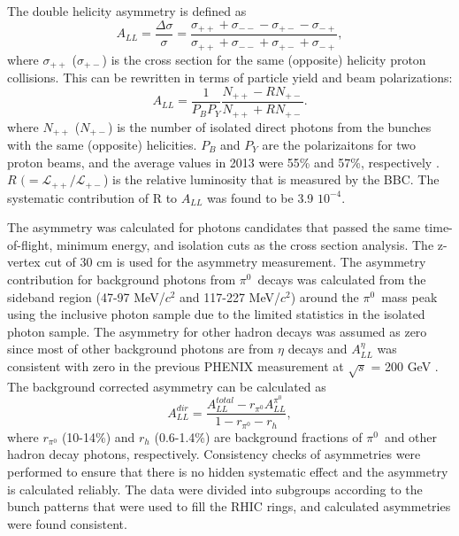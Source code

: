 \documentclass[twocolumn,letterpaper,aps,prl,longbibliography,superscriptaddress,floatfix]{revtex4-2}
\newcommand{\pizero}{\ensuremath{\pi^0}}
\begin{document}
The double helicity asymmetry is defined as
\begin{equation} \label{eq:all}
A_{LL} = \frac{\Delta\sigma}{\sigma} = \frac{\sigma_{++}+\sigma_{--}-\sigma_{+-}-\sigma_{-+}}{\sigma_{++}+\sigma_{--}+\sigma_{+-}+\sigma_{-+}},
\end{equation}
where $\sigma_{++}$ ($\sigma_{+-}$) is the cross section for the same (opposite) helicity proton collisions. This can be rewritten in terms of particle yield and beam polarizations:
\begin{equation}
A_{LL} = \frac{1}{P_BP_Y} \frac{N_{++}-RN_{+-}}{N_{++}+RN_{+-}}.
\end{equation}
where $N_{++}$ ($N_{+-}$) is the number of isolated direct photons from the bunches with the same (opposite) helicities. $P_{B}$ and $P_{Y}$ are the polarizaitons for two proton beams, and the average values in 2013 were 55\% and 57\%, respectively \cite{POBLAGUEV2020164261}. $R$ $(= \mathcal{L_{++}}/\mathcal{L_{+-}}$) is the relative luminosity that is measured by the BBC. The systematic contribution of R to $A_{LL}$ was found to be 3.9 \times $10^{-4}$.

The asymmetry was calculated for photons candidates that passed the same time-of-flight, minimum energy, and isolation cuts as the cross section analysis. The z-vertex cut of 30 cm is used for the asymmetry measurement. The asymmetry contribution for background photons from \pizero\ decays was calculated from the sideband region (47-97 MeV/$c^2$ and 117-227 MeV/$c^2$) around the \pizero\ mass peak using the inclusive photon sample due to the limited statistics in the isolated photon sample. The asymmetry for other hadron decays was assumed as zero since most of other background photons are from $\eta$ decays and $A_{LL}^{\eta}$ was consistent with zero in the previous PHENIX measurement at $\sqrt{s}$ = 200 GeV \cite{PhysRevD.90.012007}. The background corrected asymmetry can be calculated as
\begin{equation} \label{eq:all-dir}
A_{LL}^{dir} = \frac{A_{LL}^{total} - r_{\pi^0}A_{LL}^{\pi^0}}{1 - r_{\pi^0} - r_h},
\end{equation}
where $r_{\pi^0}$ (10-14\%) and $r_h$ (0.6-1.4\%) are background fractions of \pizero\ and other hadron decay photons, respectively. Consistency checks of asymmetries were performed to ensure that there is no hidden systematic effect and the asymmetry is calculated reliably. The data were divided into subgroups according to the bunch patterns that were used to fill the RHIC rings, and calculated asymmetries were found consistent.
\end{document}
